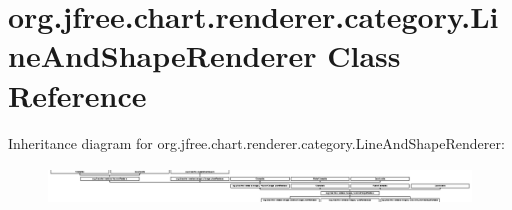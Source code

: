 \hypertarget{classorg_1_1jfree_1_1chart_1_1renderer_1_1category_1_1_line_and_shape_renderer}{}\section{org.\+jfree.\+chart.\+renderer.\+category.\+Line\+And\+Shape\+Renderer Class Reference}
\label{classorg_1_1jfree_1_1chart_1_1renderer_1_1category_1_1_line_and_shape_renderer}
Inheritance diagram for org.\+jfree.\+chart.\+renderer.\+category.\+Line\+And\+Shape\+Renderer\+:\begin{figure}[H]
\begin{center}
\leavevmode
\includegraphics[height=0.992556cm]{classorg_1_1jfree_1_1chart_1_1renderer_1_1category_1_1_line_and_shape_renderer}
\end{center}
\end{figure}
